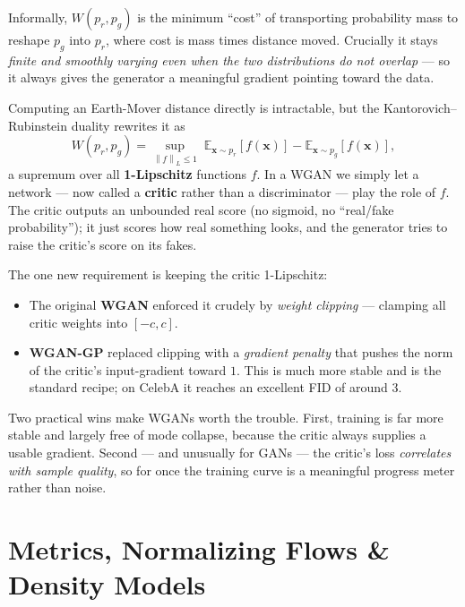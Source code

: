 \documentclass[11pt, oneside]{book}
\newcommand{\E}{\mathbb{E}}              %
\newcommand{\norm}[1]{\left\lVert #1 \right\rVert}
\newcommand{\xvec}{\mathbf{x}}
\begin{document}
\begin{defbox}[title={Wasserstein-1 (Earth-Mover) distance}]
Informally, $W(p_r, p_g)$ is the minimum ``cost'' of transporting probability mass
to reshape $p_g$ into $p_r$, where cost is mass times distance moved. Crucially it
stays \emph{finite and smoothly varying even when the two distributions do not
overlap} --- so it always gives the generator a meaningful gradient pointing
toward the data.
\end{defbox}

Computing an Earth-Mover distance directly is intractable, but the
Kantorovich--Rubinstein duality rewrites it as
\[
  W(p_r, p_g) = \sup_{\norm{f}_L \le 1}\;
    \E_{\xvec \sim p_r}[f(\xvec)] - \E_{\xvec \sim p_g}[f(\xvec)],
\]
a supremum over all \textbf{1-Lipschitz} functions $f$. In a WGAN we simply let a
network --- now called a \textbf{critic} rather than a discriminator --- play the
role of $f$. The critic outputs an unbounded real score (no sigmoid, no
``real/fake probability''); it just scores how real something looks, and the
generator tries to raise the critic's score on its fakes.

The one new requirement is keeping the critic 1-Lipschitz:
\begin{itemize}
  \item The original \textbf{WGAN} enforced it crudely by \emph{weight clipping} ---
        clamping all critic weights into $[-c, c]$.
  \item \textbf{WGAN-GP} replaced clipping with a \emph{gradient penalty} that
        pushes the norm of the critic's input-gradient toward $1$. This is much
        more stable and is the standard recipe; on CelebA it reaches an
        excellent FID of around $3$.
\end{itemize}

\begin{intbox}
Two practical wins make WGANs worth the trouble. First, training is far more
stable and largely free of mode collapse, because the critic always supplies a
usable gradient. Second --- and unusually for GANs --- the critic's loss
\emph{correlates with sample quality}, so for once the training curve is a
meaningful progress meter rather than noise.
\end{intbox}


\chapter{Metrics, Normalizing Flows \& Density Models}
\end{document}
